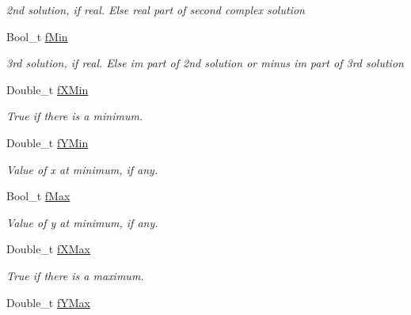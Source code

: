 \begin{DoxyCompactItemize}
\begin{DoxyCompactList}\small\item\em 2nd solution, if real. Else real part of second complex solution \end{DoxyCompactList}\item 
\hypertarget{classTPoly3_a9edebc9d273d22284e2ee4af3959420a}{Bool\-\_\-t \hyperlink{classTPoly3_a9edebc9d273d22284e2ee4af3959420a}{f\-Min}}\label{classTPoly3_a9edebc9d273d22284e2ee4af3959420a}

\begin{DoxyCompactList}\small\item\em 3rd solution, if real. Else im part of 2nd solution or minus im part of 3rd solution \end{DoxyCompactList}\item 
\hypertarget{classTPoly3_a6879c49799a99d0a4d9154052a039276}{Double\-\_\-t \hyperlink{classTPoly3_a6879c49799a99d0a4d9154052a039276}{f\-X\-Min}}\label{classTPoly3_a6879c49799a99d0a4d9154052a039276}

\begin{DoxyCompactList}\small\item\em True if there is a minimum. \end{DoxyCompactList}\item 
\hypertarget{classTPoly3_a4002b988036dff8808a61fee18059314}{Double\-\_\-t \hyperlink{classTPoly3_a4002b988036dff8808a61fee18059314}{f\-Y\-Min}}\label{classTPoly3_a4002b988036dff8808a61fee18059314}

\begin{DoxyCompactList}\small\item\em Value of x at minimum, if any. \end{DoxyCompactList}\item 
\hypertarget{classTPoly3_a2bd791e554962454fa935c03cf9c98d2}{Bool\-\_\-t \hyperlink{classTPoly3_a2bd791e554962454fa935c03cf9c98d2}{f\-Max}}\label{classTPoly3_a2bd791e554962454fa935c03cf9c98d2}

\begin{DoxyCompactList}\small\item\em Value of y at minimum, if any. \end{DoxyCompactList}\item 
\hypertarget{classTPoly3_ab444bc80192871506c9c847cacc86c43}{Double\-\_\-t \hyperlink{classTPoly3_ab444bc80192871506c9c847cacc86c43}{f\-X\-Max}}\label{classTPoly3_ab444bc80192871506c9c847cacc86c43}

\begin{DoxyCompactList}\small\item\em True if there is a maximum. \end{DoxyCompactList}\item 
\hypertarget{classTPoly3_a7b0e1305051521e24c6a19fe596e1503}{Double\-\_\-t \hyperlink{classTPoly3_a7b0e1305051521e24c6a19fe596e1503}{f\-Y\-Max}}\label{classTPoly3_a7b0e1305051521e24c6a19fe596e1503}


\end{DoxyCompactItemize}
